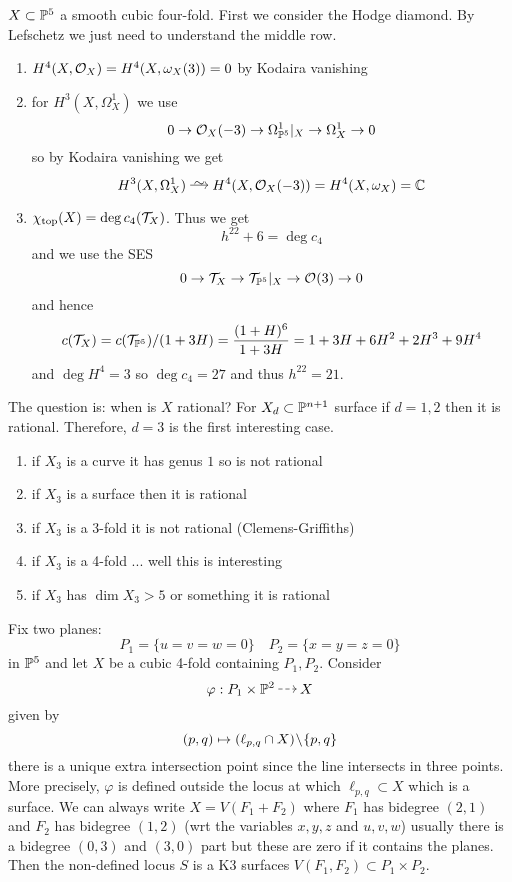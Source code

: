 \documentclass[12pt]{article}
\begin{document}
$X \subset \P^5$ a smooth cubic four-fold. First we consider the Hodge diamond. By Lefschetz we just need to understand the middle row. 
\begin{enumerate}
\item $H^4(X, \struct{X}) = H^4(X, \omega_X(3)) = 0$ by Kodaira vanishing
\item for $H^3(X, \Omega_X^1)$ we use
\[ 0 \to \struct{X}(-3) \to \Omega^1_{\P^5}|_X \to \Omega_X^1 \to 0 \]
so by Kodaira vanishing we get
\[ H^3(X, \Omega_X^1) \iso H^4(X, \struct{X}(-3)) = H^4(X, \omega_X) = \CC \]
\item $\chi_{\text{top}}(X) = \deg c_4(\T_X)$. Thus we get
\[ h^{22} + 6 = \deg c_4 \]
and we use the SES
\[ 0 \to \T_X \to \T_{\P^5}|_X \to \struct{}(3) \to 0 \]
and hence
\[ c(\T_X) = c(\T_{\P^5}) / (1 + 3 H) = \frac{(1 + H)^6}{1 + 3 H} = 1 + 3 H + 6 H^2 + 2 H^3 + 9 H^4 \]
and $\deg{H^4} = 3$ so $\deg{c_4} = 27$ and thus $h^{22} = 21$. 
\end{enumerate}
The question is: when is $X$ rational? For $X_d \subset \P^{n+1}$ surface if $d = 1,2$ then it is rational. Therefore, $d = 3$ is the first interesting case. 
\begin{enumerate}
\item if $X_3$ is a curve it has genus $1$ so is not rational
\item if $X_3$ is a surface then it is rational
\item if $X_3$ is a 3-fold it is not rational (Clemens-Griffiths)
\item if $X_3$ is a 4-fold ... well this is interesting
\item if $X_3$ has $\dim{X_3} > 5$ or something it is rational
\end{enumerate}

\begin{example}
Fix two planes:
\[ P_1 = \{ u = v = w = 0 \} \quad P_2 = \{ x = y = z = 0 \} \]
in $\P^5$ and let $X$ be a cubic 4-fold containing $P_1, P_2$. Consider
\[ \varphi : P_1 \times \P^2 \rat X \]
given by
\[ (p, q) \mapsto (\ell_{p,q} \cap X) \sm \{ p, q \} \]
there is a unique extra intersection point since the line intersects in three points. More precisely, $\varphi$ is defined outside the locus at which $\ell_{p,q} \subset X$ which is a surface. We can always write $X = V(F_1 + F_2)$ where $F_1$ has bidegree $(2,1)$ and $F_2$ has bidegree $(1,2)$ (wrt the variables $x,y,z$ and $u,v,w$) usually there is a bidegree $(0,3)$ and $(3,0)$ part but these are zero if it contains the planes. Then the non-defined locus $S$ is a K3 surfaces $V(F_1, F_2) \subset P_1 \times P_2$.
\end{example}
\end{document}
